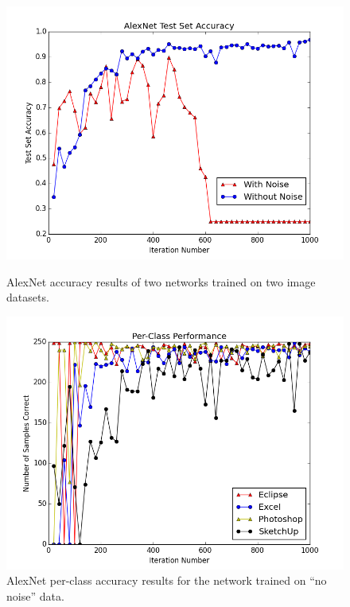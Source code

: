 \documentclass[10pt]{article}
\begin{document}
\begin{figure}[t]
\centering
  \begin{minipage}{.48\textwidth}
  \centering
  \includegraphics[width=1\linewidth]{AlexNet_Accuracy1000}
  \caption{AlexNet accuracy results of two networks trained on two image datasets.}
  \label{fig:alex_net}
  \end{minipage}\hfill
  \begin{minipage}{.48\textwidth}
  \centering
  \includegraphics[width=1\linewidth]{PerClassPerformance1000}
  \caption{AlexNet per-class accuracy results for the network trained on ``no noise'' data.}
  \label{fig:per_class}
  \end{minipage}
\end{figure}
\end{document}

